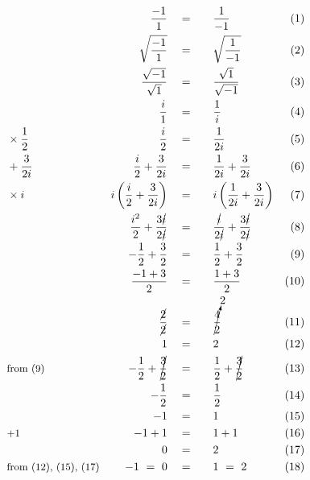 \begin{alignat*}{5}
&\,&\frac{-1}{1}\quad&=\quad&&\frac{1}{-1}\quad&(1)\\
&\,&\sqrt{\frac{-1}{1}}\quad&=&&\sqrt{\frac{1}{-1}}&(2)\\
&\,&\frac{\sqrt{-1}}{\sqrt{1}}\quad&=&&\frac{\sqrt{1}}{\sqrt{-1}}&(3)\\
&\,&\frac{i}{1}\quad&=&&\frac{1}{i}&(4)\\
&\small\times\frac{1}{2}&\frac{i}{2}\quad&=&&\frac{1}{2i}&(5)\\
&\small+\frac{3}{2i}&\frac{i}{2}+\frac{3}{2i}\quad&=&&\frac{1}{2i}+\frac{3}{2i}&(6)\\
&\times i&i\left(\frac{i}{2}+\frac{3}{2i}\right)\quad&=&&i\left(\frac{1}{2i}+\frac{3}{2i}\right)&(7)\\
&\,&\frac{i^2}{2}+\frac{3\cancel{i}}{2\cancel{i}}\quad&=&&\frac{\cancel{i}}{2\cancel{i}}+\frac{3\cancel{i}}{2\cancel{i}}&(8)\\
&\,&-\frac{1}{2}+\frac{3}{2}\quad&=&&\frac{1}{2}+\frac{3}{2}&(9)\\
&\,&\frac{-1+3}{2}\quad&=&&\frac{1+3}{2}&(10)\\
&\,&\frac{\cancel{2}}{\cancel{2}}\quad&=&&\cancelto{2}{\frac{4}{2}}&(11)\\
&\,&1\quad&=&&2&(12)\\
&\small\text{from (9)}&-\frac{1}{2}+\cancel{\frac{3}{2}}\quad&=&&\frac{1}{2}+\cancel{\frac{3}{2}}&(13)\\
&\,&-\frac{1}{2}\quad&=&&\frac{1}{2}&(14)\\
&\,&-1\quad&=&&1&(15)\\
&\small\text{+1}&-1+1\quad&=&&1+1&(16)\\
&\,&0\quad&=&&2&(17)\\
&\small\text{from (12), (15), (17)}&-1~=~0\quad&=&&1~=~2&(18)
\end{alignat*}
